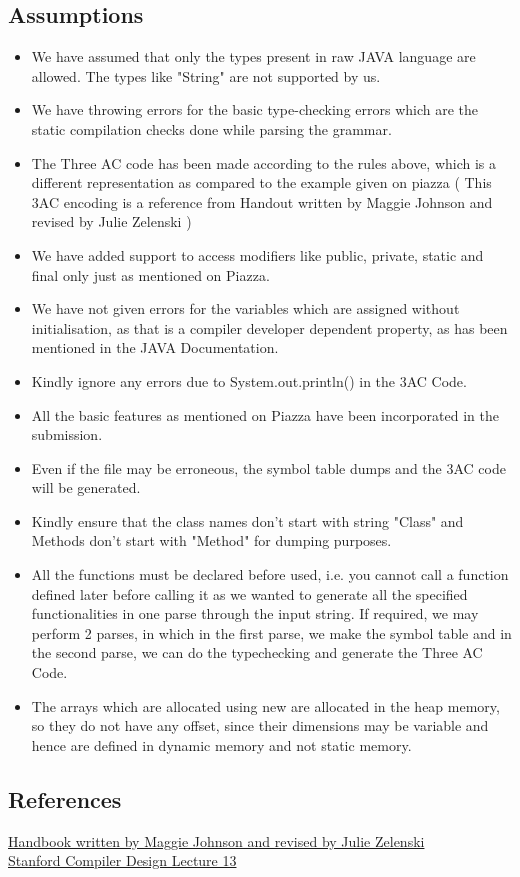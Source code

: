 \documentclass[12pt]{article}
\begin{document}
    \subsection*{Assumptions}
    \begin{itemize}
        \item We have assumed that only the types present in raw JAVA language are allowed. The types like "String" are not supported by us.
        \item We have throwing errors for the basic type-checking errors which are the static compilation checks done while parsing the grammar.
        \item The Three AC code has been made according to the rules above, which is a different representation as compared to the example given on piazza ( This 3AC encoding is a reference from Handout written by Maggie Johnson and revised by Julie Zelenski )
        \item We have added support to access modifiers like public, private, static and final only just as mentioned on Piazza.
        \item We have not given errors for the variables which are assigned without initialisation, as that is a compiler developer dependent property, as has been mentioned in the JAVA Documentation.
        \item Kindly ignore any errors due to System.out.println() in the 3AC Code.
        \item All the basic features as mentioned on Piazza have been incorporated in the submission.
        \item Even if the file may be erroneous, the symbol table dumps and the 3AC code will be generated.
        \item Kindly ensure that the class names don't start with string "Class" and Methods don't start with "Method" for dumping purposes.
        \item All the functions must be declared before used, i.e. you cannot call a function defined later before calling it as we wanted to generate all the specified functionalities in one parse through the input string. If required, we may perform 2 parses, in which in the first parse, we make the symbol table and in the second parse, we can do the typechecking and generate the Three AC Code.
        \item  The arrays which are allocated using new are allocated in the heap memory, so they do not have any offset, since their dimensions may be variable and hence are defined in dynamic memory and not static memory.
    \end{itemize}

\subsection*{References}
\href{http://web.archive.org/web/20151010192637/http://www.dound.com/courses/cs143/handouts/17-TAC-Examples.pdf}{Handbook written by Maggie Johnson and revised by Julie Zelenski} \\
\href{https://web.stanford.edu/class/archive/cs/cs143/cs143.1128/lectures/13/Slides13.pdf}{Stanford Compiler Design Lecture 13}
\end{document}
